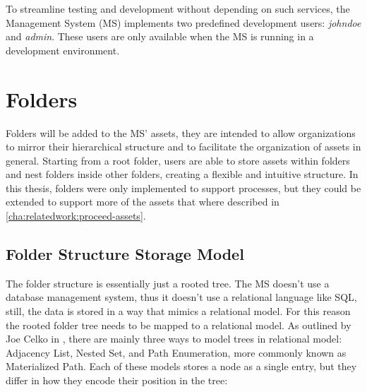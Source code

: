 To streamline testing and development without depending on such services,
the Management System (MS) implements two predefined development users: \textit{johndoe} and \textit{admin}.
These users are only available when the MS is running in a development environment.


%

\section{Folders}
\label{cha:conceptanddesign:folders}

Folders will be added to the MS' assets,
they are intended to allow organizations to mirror their hierarchical structure and
to facilitate the organization of assets in general.
Starting from a root folder, users are able to store assets within folders and nest
folders inside other folders, creating a flexible and intuitive structure.
In this thesis, folders were only implemented to support processes, but they could be extended to
support more of the assets that where described in \ref{cha:relatedwork:proceed-assets}.

\subsection{Folder Structure Storage Model}


The folder structure is essentially just a rooted tree.
The MS doesn't use a database management system, thus it doesn't use a relational
language like SQL, still, the data is stored in a way that mimics a relational model.
For this reason the rooted folder tree needs to be mapped to a relational model.
%
As outlined by Joe Celko in \cite[28]{celkoSQLTrees}, there are mainly three ways to model
trees in relational model:
Adjacency List, Nested Set, and  Path Enumeration, more commonly known as Materialized Path.
Each of these models stores a node as a single entry, but they differ in how they encode
their position in the tree:

